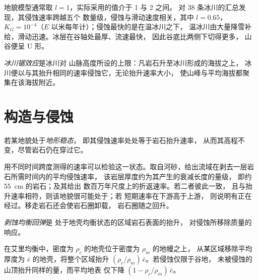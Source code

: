 地貌模型通常取 $l = 1$，实际采用的值介于 1 与 2 之间。
对 38 条冰川的汇总发现，其侵蚀速率跨越五个
数量级，侵蚀与滑动速度相关，其中 $l = 0.65$，
$K_G = 10^{-4}$（$E$ 以米每年计）；侵蚀最快的是在温冰川之下，
温冰川由大量降雪补给，滑动迅速。冰层在谷轴处最厚、流速最快，
因此谷底比两侧下切得更多，
山谷便呈 U 形。

\begin{definition}[冰川锯效应]\label{def:b3:quantitative-geomorphology:buzzsaw}
\emph{冰川锯效应}是冰川对
山脉高度所设的上限：凡岩石升至冰川形成的海拔之上，
冰川便以与其抬升相同的速率侵蚀它，无论抬升速率大小，
使山峰与平均海拔都聚集在该海拔附近。
\end{definition}

\section{构造与侵蚀}\label{sec:b3:quantitative-geomorphology:tectonics}

\begin{definition}[地形稳态]\label{def:b3:quantitative-geomorphology:steady-state}
若某地貌处于\emph{地形稳态}，
即其侵蚀速率处处等于岩石抬升速率，
从而其高程不变，尽管岩石仍在穿过它。
\end{definition}

用不同时间跨度测得的速率可以检验这一状态。取自河砂，给出流域在剥去一层岩石所需时间内的平均侵蚀速率，
该岩层厚度约为其产生的衰减长度的量级，
即约 \qty{55}{cm} 的岩石；及其给出
数百万年尺度上的折返速率。若二者彼此一致，
且与抬升速率相符，则该地貌很可能处于；若
短期速率在下游高于上游，
则说明有正在经过。移走岩石还会使岩石圈卸载，
岩石圈随之回升。

\begin{definition}[剥蚀均衡回弹]\label{def:b3:quantitative-geomorphology:rebound}
\emph{剥蚀均衡回弹}是
处于地壳均衡状态的区域岩石表面的抬升，
对侵蚀所移除质量的响应。
\end{definition}

\begin{proposition}\label{prop:b3:quantitative-geomorphology:rebound}
在艾里均衡中，密度为 $\rho_c$ 的地壳位于密度为 $\rho_m$ 的地幔之上，
从某区域移除平均厚度为 $\bar e$ 的地壳，将整个区域抬升
$(\rho_c/\rho_m)\,\bar e$。若侵蚀仅限于谷地，
未被侵蚀的山顶抬升同样的量，而平均地表
仅下降 $(1 - \rho_c/\rho_m)\,\bar e$。
\end{proposition}

